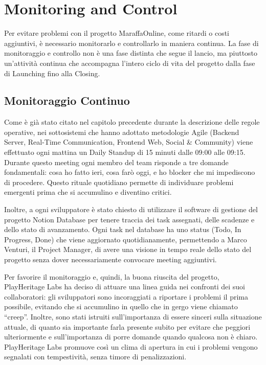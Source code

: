 \chapter{Monitoring and Control}

Per evitare problemi con il progetto MaraffaOnline, come ritardi o costi aggiuntivi, è necessario monitorarlo e controllarlo in maniera continua. La fase di monitoraggio e controllo non è una fase distinta che segue il lancio, ma piuttosto un'attività continua che accompagna l'intero ciclo di vita del progetto dalla fase di Launching fino alla Closing.

\section{Monitoraggio Continuo}

Come è già stato citato nel capitolo precedente durante la descrizione delle regole operative, nei sottosistemi che hanno adottato metodologie Agile (Backend Server, Real-Time Communication, Frontend Web, Social \& Community) viene effettuato ogni mattina un Daily Standup di 15 minuti dalle 09:00 alle 09:15. Durante questo meeting ogni membro del team risponde a tre domande fondamentali: cosa ho fatto ieri, cosa farò oggi, e ho blocker che mi impediscono di procedere. Questo rituale quotidiano permette di individuare problemi emergenti prima che si accumulino e diventino critici.

Inoltre, a ogni sviluppatore è stato chiesto di utilizzare il software di gestione del progetto Notion Database per tenere traccia dei task assegnati, delle scadenze e dello stato di avanzamento. Ogni task nel database ha uno status (Todo, In Progress, Done) che viene aggiornato quotidianamente, permettendo a Marco Venturi, il Project Manager, di avere una visione in tempo reale dello stato del progetto senza dover necessariamente convocare meeting aggiuntivi.

Per favorire il monitoraggio e, quindi, la buona riuscita del progetto, PlayHeritage Labs ha deciso di attuare una linea guida nei confronti dei suoi collaboratori: gli sviluppatori sono incoraggiati a riportare i problemi il prima possibile, evitando che si accumulino in quello che in gergo viene chiamato ``creep''. Inoltre, sono stati istruiti sull'importanza di essere sinceri sulla situazione attuale, di quanto sia importante farla presente subito per evitare che peggiori ulteriormente e sull'importanza di porre domande quando qualcosa non è chiaro. PlayHeritage Labs promuove così un clima di apertura in cui i problemi vengono segnalati con tempestività, senza timore di penalizzazioni.

